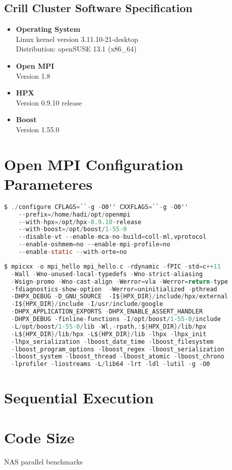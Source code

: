 \subsection{Crill Cluster Software Specification}
\begin{itemize}
\item \textbf{Operating System}\\
  Linux kernel version 3.11.10-21-desktop\\
  Distribution: openSUSE 13.1 (x86\_64)
\item \textbf{Open MPI}\\
  Version 1.8
\item \textbf{HPX}\\
  Version 0.9.10 release
\item \textbf{Boost}\\
  Version 1.55.0
\end{itemize}

\section{Open MPI Configuration Parameteres}
\begin{lstlisting}[language=C, frame=single, basicstyle=\footnotesize, caption=Configure Line of Open MPI with HPX-RTE\label{lst:config-hpxrte}]
  $ ./configure CFLAGS=``-g -O0'' CXXFLAGS=``-g -O0''
    --prefix=/home/hadi/opt/openmpi
    --with-hpx=/opt/hpx-0.9.10-release
    --with-boost=/opt/boost/1-55-0
    --disable-vt --enable-mca-no-build=coll-ml,vprotocol
    --enable-oshmem=no --enable-mpi-profile=no
    --enable-static --with-orte=no
\end{lstlisting}


\begin{lstlisting}[language=C, frame=single, basicstyle=\footnotesize, caption=Compile line for Hello World\label{lst:compile}]
  $ mpicxx -o mpi_hello mpi_hello.c -rdynamic -fPIC -std=c++11
  -Wall -Wno-unused-local-typedefs -Wno-strict-aliasing
  -Wsign-promo -Wno-cast-align -Werror=vla -Werror=return-type
  -fdiagnostics-show-option  -Werror=uninitialized -pthread
  -DHPX_DEBUG -D_GNU_SOURCE  -I${HPX_DIR}/include/hpx/external
  -I${HPX_DIR}/include -I/usr/include/google
  -DHPX_APPLICATION_EXPORTS -DHPX_ENABLE_ASSERT_HANDLER
  -DHPX_DEBUG -finline-functions -I/opt/boost/1-55-0/include
  -L/opt/boost/1-55-0/lib -Wl,-rpath,:${HPX_DIR}/lib/hpx
  -L${HPX_DIR}/lib/hpx -L${HPX_DIR}/lib -lhpx -lhpx_init
  -lhpx_serialization -lboost_date_time -lboost_filesystem
  -lboost_program_options -lboost_regex -lboost_serialization
  -lboost_system -lboost_thread -lboost_atomic -lboost_chrono
  -lprofiler -liostreams -L/lib64 -lrt -ldl -lutil -g -O0
\end{lstlisting}



\section{Sequential Execution}


\section{Code Size}

NAS parallel benchmarks~\cite{bailey1991parallel}
